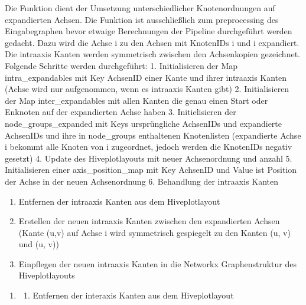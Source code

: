 \documentclass[a4paper,10pt,ngerman]{sphinxmanual}
\begin{document}
\begin{fulllineitems}
\begin{fulllineitems}
\label{\detokenize{api:src.hiveplot.HivePlotLayout.pre_processing_expansion}}
\pysigstartsignatures
\pysiglinewithargsret
{}
{}
{}
\pysigstopsignatures
\sphinxAtStartPar
Die Funktion dient der Umsetzung unterschiedlicher Knotenordnungen auf expandierten Achsen. Die Funktion ist ausschließlich zum pre\sphinxhyphen{}processing des Eingabegraphen bevor etwaige Berechnungen der Pipeline durchgeführt werden gedacht. Dazu wird die Achse i zu den Achsen mit KnotenIDs i und \sphinxhyphen{}i expandiert.  Die intra\sphinxhyphen{}axis Kanten werden symmetrisch zwischen den Achsenkopien gezeichnet.
Folgende Schritte werden durchgeführt:
1. Initialisieren der Map intra\_expandables mit Key AchsenID einer Kante und ihrer intra\sphinxhyphen{}axis Kanten (Achse wird nur aufgenommen, wenn es intra\sphinxhyphen{}axis Kanten gibt)
2. Initialisieren der Map inter\_expandables mit allen Kanten die genau einen Start oder Enknoten auf der expandierten Achse haben
3. Initielisieren der node\_groups\_expanded mit Keys ursprüngliche AchsenIDs und expandierte AchsenIDs und ihre in node\_groups enthaltenen Knotenlisten (expandierte Achse \sphinxhyphen{}i bekommt alle Knoten von i zugeordnet, jedoch werden die KnotenIDs negativ gesetzt)
4. Update des Hiveplotlayouts mit neuer Achsenordnung und \sphinxhyphen{}anzahl
5. Initialisieren einer axis\_position\_map mit Key AchsenID und Value ist Position der Achse in der neuen Achsenordnung
6. Behandlung der intra\sphinxhyphen{}axis Kanten
\begin{enumerate}
%
\item {} 
\sphinxAtStartPar
Entfernen der intra\sphinxhyphen{}axis Kanten aus dem Hiveplotlayout

\item {} 
\sphinxAtStartPar
Erstellen der neuen intra\sphinxhyphen{}axis Kanten zwischen den expandierten Achsen (Kante (u,v) auf Achse i wird symmetrisch gespiegelt zu den Kanten (\sphinxhyphen{}u, v) und (u, \sphinxhyphen{}v))

\item {} 
\sphinxAtStartPar
Einpflegen der neuen intra\sphinxhyphen{}axis Kanten in die Networkx Graphenstruktur des Hiveplotlayouts

\end{enumerate}
\begin{enumerate}
%
\setcounter{enumi}{6}
\item {} \begin{description}
\begin{enumerate}
%
\item {} 
\sphinxAtStartPar
Entfernen der inter\sphinxhyphen{}axis Kanten aus dem Hiveplotlayout


\end{enumerate}
\end{description}
\end{enumerate}
\end{fulllineitems}
\end{fulllineitems}
\end{document}
